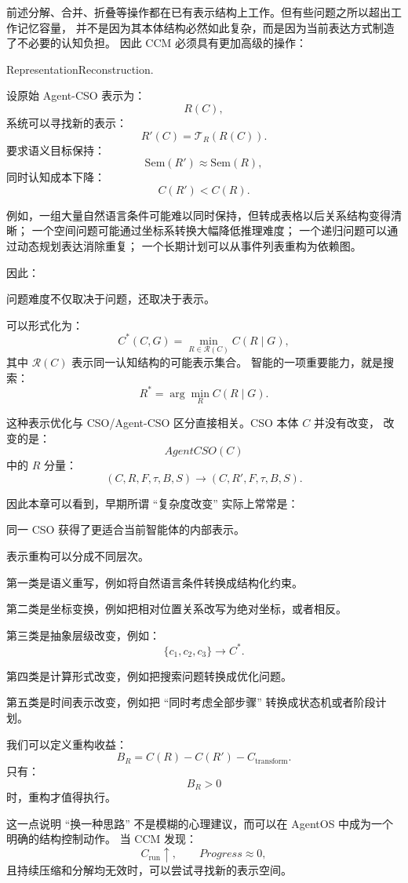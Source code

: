 前述分解、合并、折叠等操作都在已有表示结构上工作。但有些问题之所以超出工作记忆容量，
并不是因为其本体结构必然如此复杂，而是因为当前表达方式制造了不必要的认知负担。
因此 CCM 必须具有更加高级的操作：
\begin{statementbox}
RepresentationReconstruction.
\end{statementbox}

设原始 Agent-CSO 表示为：
\[
R(C),
\]
系统可以寻找新的表示：
\[
R'(C)
=
\mathcal T_R(R(C)).
\]
要求语义目标保持：
\[
\mathrm{Sem}(R')
\approx
\mathrm{Sem}(R),
\]
同时认知成本下降：
\[
C(R')
<
C(R).
\]

例如，一组大量自然语言条件可能难以同时保持，但转成表格以后关系结构变得清晰；
一个空间问题可能通过坐标系转换大幅降低推理难度；
一个递归问题可以通过动态规划表达消除重复；
一个长期计划可以从事件列表重构为依赖图。

因此：
\begin{statementbox}
问题难度不仅取决于问题，还取决于表示。
\end{statementbox}

可以形式化为：
\[
C^*(C,G)
=
\min_{R\in\mathcal R(C)}
C(R\mid G),
\]
其中 $\mathcal R(C)$ 表示同一认知结构的可能表示集合。
智能的一项重要能力，就是搜索：
\[
R^*
=
\arg\min_R
C(R\mid G).
\]

这种表示优化与 CSO/Agent-CSO 区分直接相关。CSO 本体 $C$ 并没有改变，
改变的是：
\[
AgentCSO(C)
\]
中的 $R$ 分量：
\[
(C,R,F,\tau,B,S)
\longrightarrow
(C,R',F,\tau,B,S).
\]

因此本章可以看到，早期所谓 ``复杂度改变'' 实际上常常是：
\begin{statementbox}
同一 CSO 获得了更适合当前智能体的内部表示。
\end{statementbox}

表示重构可以分成不同层次。

第一类是语义重写，例如将自然语言条件转换成结构化约束。

第二类是坐标变换，例如把相对位置关系改写为绝对坐标，或者相反。

第三类是抽象层级改变，例如：
\[
\{c_1,c_2,c_3\}
\longrightarrow
C^*.
\]

第四类是计算形式改变，例如把搜索问题转换成优化问题。

第五类是时间表示改变，例如把 ``同时考虑全部步骤'' 转换成状态机或者阶段计划。

我们可以定义重构收益：
\[
B_R
=
C(R)-C(R')
-
C_{\mathrm{transform}}.
\]
只有：
\[
B_R>0
\]
时，重构才值得执行。

这一点说明 ``换一种思路'' 不是模糊的心理建议，而可以在 AgentOS 中成为一个明确的结构控制动作。
当 CCM 发现：
\[
C_{\mathrm{run}}\uparrow,
\qquad
Progress\approx0,
\]
且持续压缩和分解均无效时，可以尝试寻找新的表示空间。

